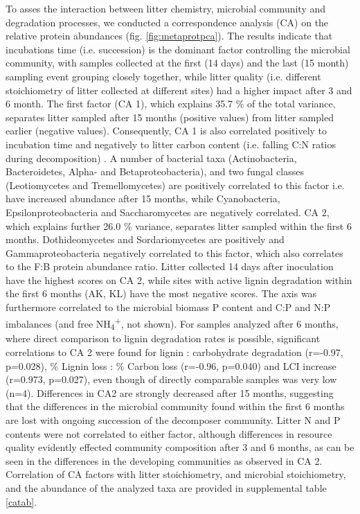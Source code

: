 To asses the interaction between litter chemistry, microbial community and degradation processes, we conducted a correspondence analysis (CA) on the relative protein abundances (fig. \ref{fig:metaprotpca}). The results indicate that incubations time (i.e. succession) is the dominant factor controlling the microbial community, with samples collected at the first (14 days) and the last (15 month) sampling event grouping closely together, while litter quality (i.e. different stoichiometry of litter collected at different sites) had a higher impact after 3 and 6 month. The first factor (CA 1), which explains 35.7 \% of the total variance, separates litter sampled after 15 months (positive values) from litter sampled earlier (negative values). Consequently, CA 1 is also correlated positively to incubation time and negatively to litter carbon content (i.e. falling C:N ratios during decomposition) . A number of bacterial taxa (Actinobacteria, Bacteroidetes, Alpha- and Betaproteobacteria), and two fungal classes (Leotiomycetes and Tremellomycetes) are positively correlated to this factor i.e. have increased abundance after 15 months, while Cyanobacteria, Epsilonproteobacteria and Saccharomycetes are negatively correlated. CA 2, which explains further 26.0 \% variance, separates litter sampled within the first 6 months. Dothideomycetes and Sordariomycetes are positively and Gammaproteobacteria negatively correlated to this factor, which also correlates to the F:B protein abundance ratio. Litter collected 14 days after inoculation have the highest scores on CA 2, while sites with active lignin degradation within the first 6 months (AK, KL) have the most negative scores. The axis was furthermore correlated to the microbial biomass P content and C:P and N:P imbalances (and free NH\textsubscript{4}\textsuperscript{+}, not shown). For samples analyzed after 6 months, where direct comparison to lignin degradation rates is possible, significant correlations to CA 2 were found for lignin : carbohydrate degradation (r=-0.97, p=0.028), \% Lignin loss : \% Carbon loss (r=-0.96, p=0.040) and  LCI increase (r=0.973, p=0.027), even though of directly comparable samples was very low (n=4). Differences in CA2 are strongly decreased after 15 months, suggesting that the differences in the microbial community found within the first 6 months are lost with ongoing succession of the decomposer community. Litter N and P contents were not correlated to either factor, although differences in resource quality evidently effected community composition after 3 and 6 months, as can be seen in the differences in the developing communities as observed in CA 2. Correlation of CA factors with litter stoichiometry, and microbial stoichiometry, and the abundance of the analyzed taxa are provided in supplemental table \ref{catab}.

